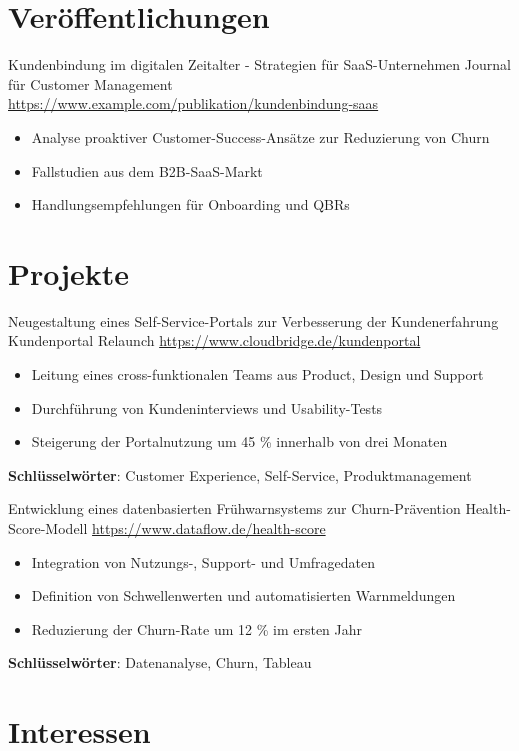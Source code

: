 \documentclass[a4paper, serif, 10pt]{moderncv}
\begin{document}
\section{Veröffentlichungen}

        {Kundenbindung im digitalen Zeitalter - Strategien für SaaS-Unternehmen}
        {Journal für Customer Management}
        {\url{https://www.example.com/publikation/kundenbindung-saas}}
        {}
        {\begin{itemize}
\item Analyse proaktiver Customer-Success-Ansätze zur Reduzierung von Churn
\item Fallstudien aus dem B2B-SaaS-Markt
\item Handlungsempfehlungen für Onboarding und QBRs
\end{itemize}}
\section{Projekte}

        {Neugestaltung eines Self-Service-Portals zur Verbesserung der Kundenerfahrung}
        {Kundenportal Relaunch}
        {\url{https://www.cloudbridge.de/kundenportal}}
        {}
        {\begin{itemize}
\item Leitung eines cross-funktionalen Teams aus Product, Design und Support
\item Durchführung von Kundeninterviews und Usability-Tests
\item Steigerung der Portalnutzung um 45 \% innerhalb von drei Monaten
\end{itemize}
\textbf{Schlüsselwörter}: Customer Experience, Self-Service, Produktmanagement}

        {Entwicklung eines datenbasierten Frühwarnsystems zur Churn-Prävention}
        {Health-Score-Modell}
        {\url{https://www.dataflow.de/health-score}}
        {}
        {\begin{itemize}
\item Integration von Nutzungs-, Support- und Umfragedaten
\item Definition von Schwellenwerten und automatisierten Warnmeldungen
\item Reduzierung der Churn-Rate um 12 \% im ersten Jahr
\end{itemize}
\textbf{Schlüsselwörter}: Datenanalyse, Churn, Tableau}
\section{Interessen}
\end{document}
